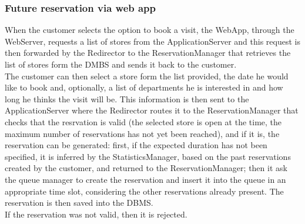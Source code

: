 \subsubsection{Future reservation via web app}
\begin{figure}[H]
	\noindent
\end{figure}
When the customer selects the option to book a visit, the WebApp, through the WebServer, requests a list of stores from the ApplicationServer and this request is then forwarded by the Redirector to the ReservationManager that retrieves the list of stores form the DMBS and sends it back to the customer.\\
The customer can then select a store form the list provided, the date he would like to book and, optionally, a list of departments he is interested in and how long he thinks the visit will be. This information is then sent to the ApplicationServer where the Redirector routes it to the ReservationManager that checks that the resrvation is valid (the selected store is open at the time, the maximum number of reservations has not yet been reached), and if it is, the reservation can be generated: first, if the expected duration has not been specified, it is inferred by the StatisticsManager, based on the past reservations created by the customer, and returned to the ReservationManager; then it ask the queue manager to create the reservation and insert it into the queue in an appropriate time slot, considering the other reservations already present. The reservation is then saved into the DBMS.\\
If the reservation was not valid, then it is rejected.
